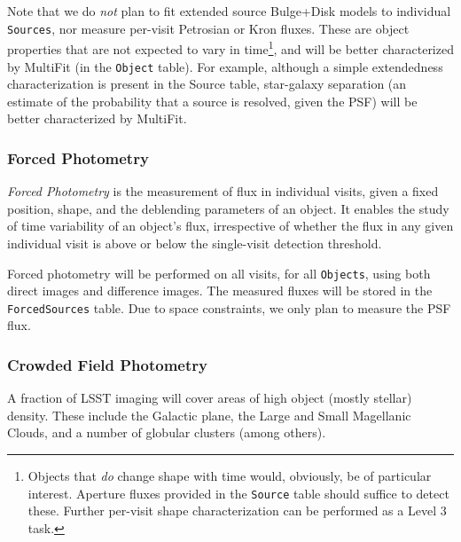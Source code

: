 \documentclass[12pt]{article}
\newcommand{\code}[1]{\texttt{#1}}
\newcommand{\Object}{\code{Object}\xspace}
\newcommand{\Objects}{\code{Objects}\xspace}
\newcommand{\Source}{\code{Source}\xspace}
\newcommand{\Sources}{\code{Sources}\xspace}
\newcommand{\ForcedSources}{\code{ForcedSources}\xspace}
\begin{document}
Note that we do {\em not} plan to fit extended source Bulge+Disk models to individual \Sources, nor measure per-visit Petrosian or Kron fluxes. These are object properties that are not expected to vary in time\footnote{Objects that {\em do} change shape with time would, obviously, be of particular interest. Aperture fluxes provided in the \Source table should suffice to detect these. Further per-visit shape characterization can be performed as a Level 3 task.}, and will be better characterized by MultiFit (in the \Object table).
For example, although a simple extendedness characterization is present in the Source table, star-galaxy separation (an estimate of the probability that a source is resolved, given the PSF) will be better characterized by MultiFit.


\subsubsection{Forced Photometry}
\label{sec:forcedPhotL2}

{\em Forced Photometry} is the measurement of flux in individual visits, given a fixed position, shape, and the deblending parameters of an object. It enables the study of time variability of an object's flux, irrespective of whether the flux in any given individual visit is above or below the single-visit detection threshold.

Forced photometry will be performed on all visits, for all \Objects, using both direct images and difference images.
The measured fluxes will be stored in the \ForcedSources table. Due to space constraints, we only plan to measure the PSF flux.

\subsubsection{Crowded Field Photometry}

A fraction of LSST imaging will cover areas of high object (mostly stellar) density. These include the Galactic plane, the Large and Small Magellanic Clouds, and a number of globular clusters (among others).
\\

\end{document}
